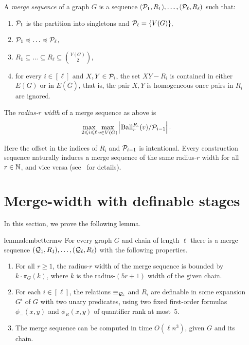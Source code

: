 \begin{definition}\label{def:merge-sequence}
A \emph{merge sequence} of a graph $G$ is a sequence
$(\mathcal P_1,R_1),\ldots,(\mathcal P_\ell,R_\ell)$ such that:
\begin{enumerate}
  \item $\mathcal P_1$ is the partition into
singletons and $\mathcal P_\ell=\{V(G)\}$,  
\item $\PP_1\preceq \dots\preceq \PP_\ell$, 
\item $R_1\subseteq \dots\subseteq R_\ell\subseteq \binom{V(G)}{2}$,
\item for every $i\in[\ell]$ and $X,Y\in \mathcal P_i$,
the set $XY-R_i$ is contained in either $E(G)$ or in $E(\overline G)$,
 that is, the pair $X,Y$ is homogeneous once pairs in $R_i$ are ignored.
\end{enumerate}

  The \emph{radius-$r$ width} of a merge sequence as above is
\begin{equation}\label{eq:merge-seq-width}
  \max_{2\leqslant i\leqslant \ell}\max_{v\in V(G)}
  \left|\operatorname{Ball}^{R_i}_r(v)/\mathcal P_{i-1}\right|.
\end{equation}
\end{definition}
\noindent 
Here the offset in the indices of $R_i$ and $\mathcal P_{i-1}$ is intentional.
Every construction sequence naturally induces a merge sequence of the same radius-$r$ width for all $r\in\mathbb N$, and vice versa (see~\cite{mw-arxiv,mw-stoc} for details).




\section{Merge-width with definable stages}\label{sec:better-definable-mw}
\label{sec:definable-mw}


In this section, we prove the following lemma.


\begin{restatable}{lemma}{lembettermw}\label{lem:better-mw}
For every graph $G$ and chain of length $\ell$ there is a merge sequence $(\mathcal Q_1, R_1), \ldots, (\mathcal Q_\ell, R_\ell)$ with the following properties.
    \begin{enumerate}
        \item For all $r\ge 1$,  the radius-$r$ width of the merge sequence is bounded by $k\cdot \pi_G(k)$, where $k$ is the radius-$(5r+1)$ width of the given chain.
        \item  For each $i\in [\ell]$, the relations $\equiv_{\mathcal Q_i}$ and $R_i$ are definable in some expansion $G^i$ of $G$ with two unary predicates, using two fixed first-order formulas $\phi_\equiv(x,y)$ and $\phi_R(x,y)$ of quantifier rank at most~$5$.
        \item The merge sequence can be computed in time $O(\ell n^3)$, given $G$ and its chain.
    \end{enumerate}    
\end{restatable}



